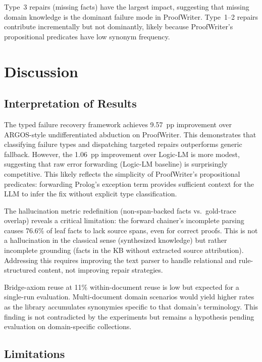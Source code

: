 \documentclass[11pt,letterpaper]{article}
\begin{document}
Type~3 repairs (missing facts) have the largest impact, suggesting that missing domain knowledge is the dominant failure mode in ProofWriter. Type~1--2 repairs contribute incrementally but not dominantly, likely because ProofWriter's propositional predicates have low synonym frequency.

\section{Discussion}
\label{sec:discussion}

\subsection{Interpretation of Results}

The typed failure recovery framework achieves 9.57~pp improvement over ARGOS-style undifferentiated abduction on ProofWriter. This demonstrates that classifying failure types and dispatching targeted repairs outperforms generic fallback. However, the 1.06~pp improvement over Logic-LM is more modest, suggesting that raw error forwarding (Logic-LM baseline) is surprisingly competitive. This likely reflects the simplicity of ProofWriter's propositional predicates: forwarding Prolog's exception term provides sufficient context for the LLM to infer the fix without explicit type classification.

The hallucination metric redefinition (non-span-backed facts vs.\ gold-trace overlap) reveals a critical limitation: the forward chainer's incomplete parsing causes 76.6\% of leaf facts to lack source spans, even for correct proofs. This is not a hallucination in the classical sense (synthesized knowledge) but rather incomplete grounding (facts in the KB without extracted source attribution). Addressing this requires improving the text parser to handle relational and rule-structured content, not improving repair strategies.

Bridge-axiom reuse at 11\% within-document reuse is low but expected for a single-run evaluation. Multi-document domain scenarios would yield higher rates as the library accumulates synonymies specific to that domain's terminology. This finding is not contradicted by the experiments but remains a hypothesis pending evaluation on domain-specific collections.

\subsection{Limitations}
\end{document}
